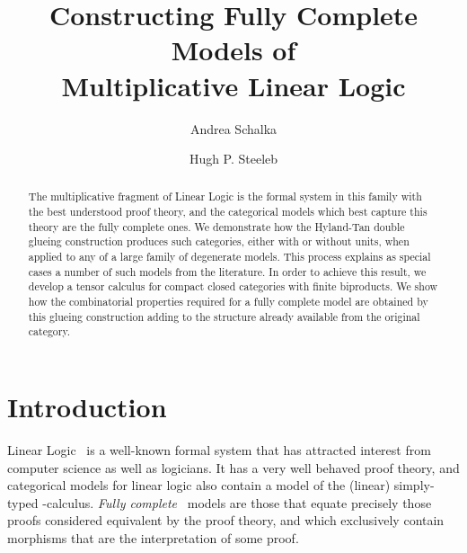 \documentclass{LMCS}
\theoremstyle{plain}\newtheorem*{cLm}{Claim}
\newcommand{\hugh}[1]{#1}
\begin{document}
\title[Constructing Fully Complete Models of Multiplicative Linear Logic]{Constructing Fully Complete Models of \\ Multiplicative Linear Logic\rsuper*}

\author[A.~Schalk]{Andrea Schalk\rsuper a}	\address{{\lsuper a}School of Computer Science, University of Manchester, Oxford Road, Manchester M13 9PL, UK}	  

\author[H.~P.~Steele]{Hugh P. Steele\rsuper b}	\address{{\lsuper b}Universit\'e Paris 13, Sorbonne Paris Cit\'e, LIPN, CNRS, F-93430, Villetaneuse, France}	  











\begin{abstract}
The multiplicative fragment of Linear Logic is the formal system in this family with the best understood proof theory, and the categorical models which best capture this theory are the fully complete ones. We demonstrate how the Hyland-Tan double glueing construction produces such categories, either with or without units, when applied to any of a large family of degenerate models. This process explains as special cases a number of such models from the literature. In order to achieve this result, we develop a tensor calculus for compact closed categories with finite biproducts. We show how the combinatorial properties required for a fully complete model are obtained by this glueing construction adding to the structure already available from the original category.
\end{abstract}

\maketitle

\section{Introduction}

Linear Logic~\cite{Gir87} is a well-known formal system that has
attracted interest from computer science as well as logicians. It has
a very well behaved proof theory, and categorical models for linear
logic also contain a model of the \hugh{(linear)} simply-typed -calculus. {\em
  Fully complete}~\cite{AJ94} models are those that equate precisely
those proofs considered equivalent by the proof theory, and which
exclusively contain morphisms that are the interpretation of some
proof.
\end{document}
